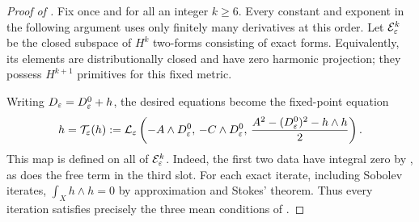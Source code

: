 \begin{proof}[Proof of ]
Fix once and for all an integer $k\ge6$.  Every constant and exponent
in the following argument uses only finitely many derivatives at
this order.  Let $\mathcal E^k_\varepsilon$ be the closed subspace of
$H^k$ two-forms consisting of exact forms.  Equivalently, its elements
are distributionally closed and have zero harmonic projection; they
possess $H^{k+1}$ primitives for this fixed metric.

Writing $D_\varepsilon=D^0_\varepsilon+h$, the desired equations become the
fixed-point equation
\begin{equation}
  h=\mathcal T_\varepsilon(h):=
   \mathcal L_\varepsilon
    \left(-A\wedge D^0_\varepsilon,\,
          -C\wedge D^0_\varepsilon,\,
          \frac{A^2-(D^0_\varepsilon)^2-h\wedge h}{2}\right).
  \label{eq:auxiliary-contraction-map}
\end{equation}
This map is defined on all of $\mathcal E^k_\varepsilon$.  Indeed, the
first two data have integral zero by
, as does the free term in the
third slot.  For each exact iterate, including Sobolev iterates,
$\int_Xh\wedge h=0$ by approximation and Stokes' theorem.
Thus every iteration satisfies precisely the three mean conditions
of .


\end{proof}
